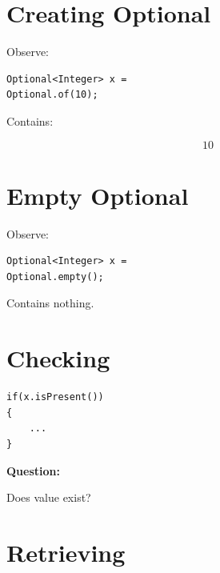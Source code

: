 \documentclass[11pt,a4paper]{book}
\begin{document}

\section{Creating Optional}

Observe:

\begin{verbatim} 
Optional<Integer> x =
Optional.of(10);
\end{verbatim}


Contains:

\[
10
\]


\section{Empty Optional}

Observe:

\begin{verbatim} 
Optional<Integer> x =
Optional.empty();
\end{verbatim}


Contains nothing.


\section{Checking}

\begin{verbatim} 
if(x.isPresent())
{
    ...
}
\end{verbatim}


\textbf{Question:}


Does value exist?


\section{Retrieving}
\end{document}
